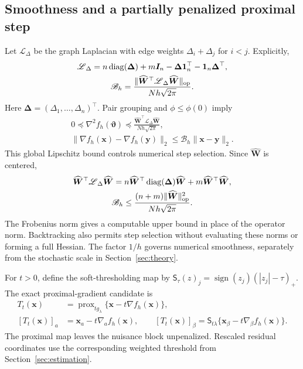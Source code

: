 \subsection{Smoothness and a partially penalized proximal step}
\label{subsec:comp-smoothness}
Let $\bm{\mathscr L}_\Delta$ be the graph Laplacian with edge weights $\Delta_i+\Delta_j$ for $i<j$. Explicitly,
\begin{equation}
 \begin{gathered}
\bm{\mathscr L}_\Delta=n\operatorname{diag}(\bm\Delta)+m\bm{I}_n
             -\bm\Delta\mathbf 1_n^\top-\mathbf 1_n\bm\Delta^\top,
 \\
 \mathscr B_h=\frac{\|\widehat{\bm{W}}^\top\bm{\mathscr L}_\Delta\widehat{\bm{W}}\|_{\rm op}}
                    {Nh\sqrt{2\pi}}.
 \end{gathered}
 \label{eq:comp-lipschitz}
\end{equation}
Here $\bm\Delta=(\Delta_1,\ldots,\Delta_n)^\top$. Pair grouping and $\phi\le\phi(0)$ imply
\begin{equation}
 \begin{gathered}
0\preceq\nabla^2f_h(\bm{\vartheta})
 \preceq\frac{\widehat{\bm{W}}^\top\bm{\mathscr L}_\Delta\widehat{\bm{W}}}{Nh\sqrt{2\pi}},
 \\
 \|\nabla f_h(\bm{x})-\nabla f_h(\bm{y})\|_2\le\mathscr B_h\|\bm{x}-\bm{y}\|_2.
 \end{gathered}
 \label{eq:comp-hessian-bound}
\end{equation}
This global Lipschitz bound controls numerical step selection. Since $\widehat{\bm{W}}$ is centered,
\[\begin{gathered}
 \widehat{\bm{W}}^\top\bm{\mathscr L}_\Delta\widehat{\bm{W}}
 =n\widehat{\bm{W}}^\top\operatorname{diag}(\bm\Delta)\widehat{\bm{W}}+m\widehat{\bm{W}}^\top\widehat{\bm{W}},
 \\
 \mathscr B_h\le\frac{(n+m)\|\widehat{\bm{W}}\|_{\rm op}^2}{Nh\sqrt{2\pi}}.
\end{gathered}\]
The Frobenius norm gives a computable upper bound in place of the operator norm. Backtracking also permits step selection without evaluating these norms or forming a full Hessian. The factor $1/h$ governs numerical smoothness, separately from the stochastic scale in Section~\ref{sec:theory}.

For $t>0$, define the soft-thresholding map by $\mathsf S_\tau(z)_j=\operatorname{sign}(z_j)(|z_j|-\tau)_+$. The exact proximal-gradient candidate is
\begin{equation}
 \begin{split}
 T_t(\bm{x})&=\operatorname{prox}_{t g_\lambda}\{\bm{x}-t\nabla f_h(\bm{x})\},\\
 [T_t(\bm{x})]_a&=\bm{x}_a-t\nabla_a f_h(\bm{x}),\qquad
 [T_t(\bm{x})]_\beta=\mathsf S_{t\lambda}\{\bm{x}_\beta-t\nabla_\beta f_h(\bm{x})\}.
 \end{split}
 \label{eq:comp-prox}
\end{equation}
The proximal map leaves the nuisance block unpenalized. Rescaled residual coordinates use the corresponding weighted threshold from Section~\ref{sec:estimation}.

